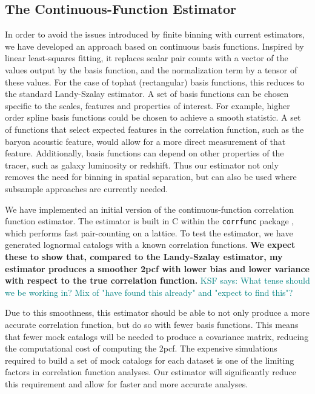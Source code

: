 \documentclass[12pt, fullpage, letterpaper]{article}
\newcommand{\KSF}[1]{\textcolor{teal}{KSF says: #1}}
\newcommand{\cf}{2pcf\xspace}
\begin{document}
\subsection{The Continuous-Function Estimator}

In order to avoid the issues introduced by finite binning with current estimators, we have developed an approach based on continuous basis functions. 
Inspired by linear least-squares fitting, it replaces scalar pair counts with a vector of the values output by the basis function, and the normalization term by a tensor of these values.
For the case of tophat (rectangular) basis functions, this reduces to the standard Landy-Szalay estimator.
A set of basis functions can be chosen specific to the scales, features and properties of interest.
For example, higher order spline basis functions could be chosen to achieve a smooth statistic. 
A set of functions that select expected features in the correlation function, such as the baryon acoustic feature, would allow for a more direct measurement of that feature.
Additionally, basis functions can depend on other properties of the tracer, such as galaxy luminosity or redshift.
Thus our estimator not only removes the need for binning in spatial separation, but can also be used where subsample approaches are currently needed.

We have implemented an initial version of the continuous-function correlation function estimator.
The estimator is built in C within the \texttt{corrfunc} package \citep{Sinha2017}, which performs fast pair-counting on a lattice.
To test the estimator, we have generated lognormal catalogs with a known correlation functions. 
\textbf{We expect these to show that, compared to the Landy-Szalay estimator, my estimator produces a smoother \cf with lower bias and lower variance with respect to the true correlation function.} \KSF{What tense should we be working in? Mix of "have found this already" and "expect to find this"?}

Due to this smoothness, this estimator should be able to not only produce a more accurate correlation function, but do so with fewer basis functions.
This means that fewer mock catalogs will be needed to produce a covariance matrix, reducing the computational cost of computing the \cf.
The expensive simulations required to build a set of mock catalogs for each dataset is one of the limiting factors in correlation function analyses.
Our estimator will significantly reduce this requirement and allow for faster and more accurate analyses.
\end{document}
